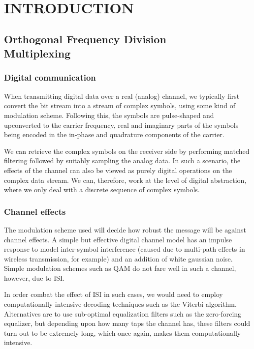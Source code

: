 \chapter{INTRODUCTION}
\label{chap:intro}

\section{Orthogonal Frequency Division \\ Multiplexing}

\subsection{Digital communication}

When transmitting digital data over a real (analog) channel, we typically first
convert the bit stream into a stream of complex symbols, using some kind of
modulation scheme. Following this, the symbols are pulse-shaped and upconverted
to the carrier frequency, real and imaginary parts of the symbols being encoded
in the in-phase and quadrature components of the carrier.

We can retrieve the complex symbols on the receiver side by performing matched
filtering followed by suitably sampling the analog data. In such a scenario,
the effects of the channel can also be viewed as purely digital operations on
the complex data stream. We can, therefore, work at the level of digital
abstraction, where we only deal with a discrete sequence of complex symbols.

\subsection{Channel effects}

The modulation scheme used will decide how robust the message will be against
channel effects. A simple but effective digital channel model has an impulse
response to model inter-symbol interference (caused due to multi-path effects
in wireless transmission, for example) and an addition of white gaussian noise.
Simple modulation schemes such as QAM do not fare well in such a channel,
however, due to ISI.

In order combat the effect of ISI in such cases, we would need to employ
computationally intensive decoding techniques such as the Viterbi algorithm.
Alternatives are to use sub-optimal equalization filters such as the
zero-forcing equalizer, but depending upon how many taps the channel has, these
filters could turn out to be extremely long, which once again, makes them
computationally intensive.

